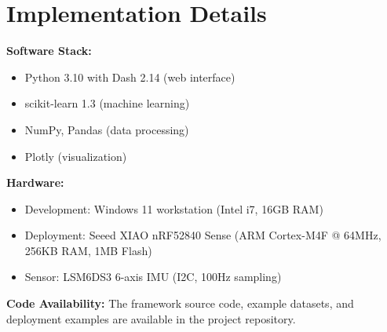 \section{Implementation Details}
\textbf{Software Stack:}
\begin{itemize}
    \item Python 3.10 with Dash 2.14 (web interface)
    \item scikit-learn 1.3 (machine learning)
    \item NumPy, Pandas (data processing)
    \item Plotly (visualization)
\end{itemize}

\textbf{Hardware:}
\begin{itemize}
    \item Development: Windows 11 workstation (Intel i7, 16GB RAM)
    \item Deployment: Seeed XIAO nRF52840 Sense (ARM Cortex-M4F @ 64MHz, 256KB RAM, 1MB Flash)
    \item Sensor: LSM6DS3 6-axis IMU (I2C, 100Hz sampling)
\end{itemize}

\textbf{Code Availability:}
The framework source code, example datasets, and deployment examples are available in the project repository.